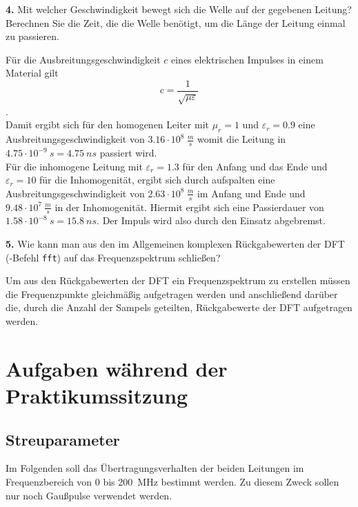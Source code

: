 \documentclass[Protokollheft.tex]{subfiles}
\begin{document}
\begin{framed}
	\noindent \textbf{4.} Mit welcher Geschwindigkeit bewegt sich die Welle auf der gegebenen Leitung? Berechnen Sie die Zeit, die die Welle benötigt, um die Länge der Leitung einmal zu passieren.\label{exer:calcSpeedTime}
\end{framed}
\noindent
Für die Ausbreitungsgeschwindigkeit $c$ eines elektrischen Impulses in einem Material gilt 
\begin{equation}
 \label{eq:cSpeed}
 c = \frac{1}{\sqrt{\mu \varepsilon}}
\end{equation}.\\
Damit ergibt sich für den homogenen Leiter mit $\mu_r = 1$ und $\varepsilon_r = 0.9$ eine Ausbreitungsgeschwindigkeit von $3.16 \cdot 10^8 \ \si{ \frac{m}{s}}$ womit die Leitung in $4.75\cdot 10^{-9} \  \si{ s} = 4.75 \  \si{ ns}$ passiert wird. \\
Für die inhomogene Leitung mit $\varepsilon_r = 1.3$ für den Anfang und das Ende und $\varepsilon_r = 10$ für die Inhomogenität, ergibt sich durch aufspalten eine Ausbreitungsgeschwindigkeit von $2.63\cdot 10^8 \ \si{\frac{m}{s}}$ im Anfang und Ende und $ 9.48 \cdot 10^7 \ \si{\frac{m}{s}}$ in der Inhomogenität. Hiermit ergibt sich eine Passierdauer von $1.58\cdot 10^{-8} \ \si{s} = 15.8 \ \si{ns}$. Der Impuls wird also durch den Einsatz abgebremst.

\begin{framed}
	\noindent \textbf{5.} Wie kann man aus den im Allgemeinen komplexen Rückgabewerten der DFT (\matlab-Befehl \verb"fft") auf das Frequenzspektrum schließen?\label{exer:freqSpectByDFT}
\end{framed}
\noindent
Um aus den Rückgabewerten der DFT ein Frequenzspektrum zu erstellen müssen die Frequenzpunkte gleichmäßig aufgetragen werden und anschließend darüber die, durch die Anzahl der Sampels geteilten, Rückgabewerte der DFT aufgetragen werden. 

\section{Aufgaben während der Praktikumssitzung}

{\subsection{Streuparameter}}

\noindent
Im Folgenden soll das Übertragungsverhalten der beiden Leitungen
im Frequenzbereich von $0$ bis \SI{200}{MHz} bestimmt werden. Zu diesem
Zweck sollen nur noch Gaußpulse verwendet werden.
\end{document}
